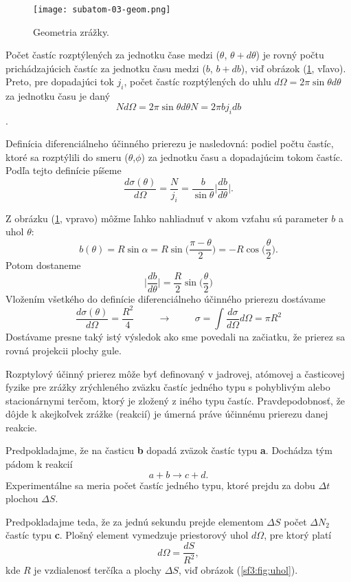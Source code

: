 \documentclass[../../main.tex]{subfiles}
\begin{document}
\begin{figure}[!h]
\texttt{[image: subatom-03-geom.png]}
\centering
\caption{Geometria zrážky.}
\label{sf3:fig:geom}
\end{figure}

Počet častíc rozptýlených za jednotku čase medzi ($\theta$, $\theta + d\theta$) je rovný počtu prichádzajúcich častíc za jednotku času medzi ($b$, $b+ db$), viď obrázok (\ref{sf3:fig:geom}, vľavo). Preto, pre dopadajúci tok $j_i$, počet častíc rozptýlených do uhlu $d\Omega=2\pi \sin\theta d\theta$ za jednotku času je daný
$$ Nd\Omega = 2\pi \sin\theta d\theta N = 2\pi b j_i db $$.

Definícia diferenciálneho účinného prierezu je nasledovná: podiel počtu častíc, ktoré sa rozptýlili do smeru ($\theta$,$\phi$) za jednotku času a dopadajúcim tokom častíc. Podľa tejto definície píšeme
$$ \frac{d\sigma(\theta)}{d\Omega} = \frac{N}{j_i} = \frac{b}{\sin\theta} \bigg\vert \frac{db}{d\theta} \bigg\vert. $$

Z obrázku (\ref{sf3:fig:geom}, vpravo) môžme ľahko nahliadnuť v akom vzťahu sú parameter $b$ a uhol $\theta$:
$$ b(\theta)=R\sin\alpha = R\sin\bigg(\frac{\pi - \theta}{2} \bigg)=-R\cos\bigg(\frac{\theta}{2} \bigg). $$
Potom dostaneme
$$ \bigg\vert \frac{db}{d\theta} \bigg\vert = \frac{R}{2}\sin\bigg(\frac{\theta}{2} \bigg) $$
Vložením všetkého do definície diferenciálneho účinného prierezu dostávame
$$ \frac{d\sigma(\theta)}{d\Omega} = \frac{R^2}{4} \hspace{1cm} \rightarrow \hspace{1cm} \sigma = \int \frac{d\sigma}{d\Omega}d\Omega=\pi R^2 $$
Dostávame presne taký istý výsledok ako sme povedali na začiatku, že prierez sa rovná projekcii plochy gule.

Rozptylový účinný prierez môže byť definovaný v jadrovej, atómovej a časticovej fyzike pre zrážky zrýchleného zväzku častíc jedného typu s pohyblivým alebo stacionárnymi terčom, ktorý je zložený z iného typu častíc. Pravdepodobnosť, že dôjde k akejkoľvek zrážke (reakcií) je úmerná práve účinnému prierezu danej reakcie. 

Predpokladajme, že na časticu \textbf{b} dopadá zväzok častíc typu \textbf{a}. Dochádza tým pádom k reakcií
$$ a+b \rightarrow c+d.$$
Experimentálne sa meria počet častíc jedného typu, ktoré prejdu za dobu $\Delta t$ plochou $\Delta S$.

Predpokladajme teda, že za jednú sekundu prejde elementom $\Delta S$ počet $\Delta N_2$ častíc typu \textbf{c}. Plošný element vymedzuje priestorový uhol $d\Omega$, pre ktorý platí
$$ d\Omega = \frac{dS}{R^2},$$ 
kde $R$ je vzdialenosť terčíka a plochy $\Delta S$, viď obrázok (\ref{sf3:fig:uhol}).
\end{document}
